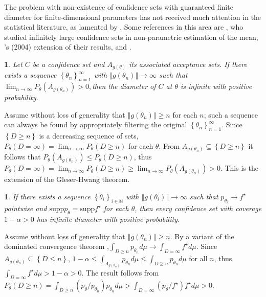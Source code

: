 \documentclass{article}
\makeatletter
\theoremstyle{plain}
\newtheorem{thm}{\protect\theoremname}
\theoremstyle{plain}
\newtheorem{lem}{\protect\lemmaname}
\theoremstyle{definition}
\theoremstyle{remark}
\theoremstyle{definition}
\theoremstyle{plain}
\theoremstyle{plain}
\theoremstyle{definition}
\newenvironment{proof}[1][\protect\proofname]{\par
	\normalfont\topsep6\p@\@plus6\p@\relax
	\trivlist
	\itemindent\parindent
	\item[\hskip\labelsep\scshape #1]\ignorespaces
}{%
	\endtrivlist\@endpefalse
}
\providecommand{\proofname}{Proof}
\providecommand{\theoremname}{Theorem}
\providecommand{\lemmaname}{Lemma}
\makeatother
\begin{document}
The problem with non-existence
of confidence sets with guaranteed finite diameter for finite-dimensional
parameters has not received much attention in the statistical literature,
as lamented by \citet{gleser996bootstrap}. Some references in this
area are \citet{bahadur1956nonexistence}, who studied infinitely
large confidence sets in non-parametric estimation of the mean, \citeauthor{romano2004non}'s
(2004) extension of their results, \citet{Donoho1988-hg} and \citet{Pfanzagl1998-fe}.
\begin{lem}
Let $C$ be a confidence set and $A_{g(\theta)}$ its associated
acceptance sets. If there exists a sequence $\left\{ \theta_{n}\right\} _{n=1}^{\infty}$
with $\left\Vert g(\theta_{n})\right\Vert \to\infty$ such
that $\lim_{n\to\infty}P_{\theta}(A_{g(\theta_{n})})>0,$then
the diameter of $C$ at $\theta$ is infinite with positive probability.
\end{lem}
\begin{proof}
Assume without loss of generality that $\left\Vert g(\theta_{n})\right\Vert \geq n$
for each $n$; such a sequence can always be found by appropriately
filtering the original $\left\{ \theta_{n}\right\} _{n=1}^{\infty}$.
Since $\left\{ D\geq n\right\} $ is a decreasing sequence of sets,
$P_{\theta}(D=\infty)=\lim_{n\to\infty}P_{\theta}(D\geq n)$
for each $\theta$. From $A_{g(\theta_{n})}\subseteq\left\{ D\geq n\right\} $
it follows that $P_{\theta}(A_{g(\theta_{n})})\leq P_{\theta}(D\geq n)$,
thus $P_{\theta}(D=\infty)=\lim_{n\to\infty}P_{\theta}(D\geq n)\geq\lim_{n\to\infty}P_{\theta}(A_{g(\theta_{n})})>0$.
\end{proof}
This is the extension of the Gleser-Hwang theorem.
\begin{thm}
\label{thm:Infinite diameter main theorem}If there exists a sequence
$\left\{ \theta_{i}\right\} _{i\in\mathbb{N}}$ with $\left\Vert g(\theta_{i})\right\Vert \to\infty$
such that $p_{\theta_{i}}\to f^{\star}$ pointwise and $\textrm{supp}p_{\theta}=\textrm{supp}f^{\star}$
for each $\theta$, then every confidence set with coverage $1-\alpha>0$
has infinite diameter with positive probability.
\end{thm}
\begin{proof}
Assume without loss of generality that $\left\Vert g(\theta_{n})\right\Vert \geq n$.
By a variant of the dominated convergence theorem \citep[exercise 16.4a]{billingsley1995probability},$\int_{D\geq n}p_{\theta_{n}}d\mu\to\int_{D=\infty}f^{\star}d\mu$.
Since $A_{g(\theta_{n})}\subseteq\left\{ D\leq n\right\} $,
$1-\alpha\leq\int_{A_{g(\theta_{n})}}p_{\theta_{n}}d\mu\leq\int_{D\geq n}p_{\theta_{n}}d\mu$
for all $n$, thus $\int_{D=\infty}f^{\star}d\mu>1-\alpha>0$. The
result follows from $P_{\theta}(D\geq n)=\int_{D\geq n}(p_{\theta}/p_{\theta_{n}})p_{\theta_{n}}d\mu>\int_{D=\infty}(p_{\theta}/f^{\star})f^{\star}d\mu>0$.
\end{proof}
\end{document}
